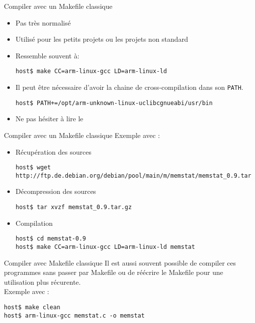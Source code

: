 \begin{frame}[fragile=singleslide]{Compiler avec un Makefile classique}
  \begin{itemize}
  \item Pas très normalisé
  \item Utilisé pour les petits projets ou les projets non standard
  \item Ressemble souvent à:
    \begin{lstlisting}
host$ make CC=arm-linux-gcc LD=arm-linux-ld 
    \end{lstlisting} %
  \item Il peut être nécessaire d'avoir la chaine de cross-compilation
    dans son \verb+PATH+.
    \begin{lstlisting}
host$ PATH+=/opt/arm-unknown-linux-uclibcgnueabi/usr/bin
    \end{lstlisting} %
  \item Ne pas hésiter à lire le 
  \end{itemize}
\end{frame}

\begin{frame}[fragile=singleslide]{Compiler avec un Makefile classique}
  Exemple avec :
  \begin{itemize}
  \item Récupération des sources
    \begin{lstlisting}
host$ wget http://ftp.de.debian.org/debian/pool/main/m/memstat/memstat_0.9.tar.gz
    \end{lstlisting}
  \item Décompression des sources
\begin{lstlisting}
host$ tar xvzf memstat_0.9.tar.gz
\end{lstlisting}
  \item Compilation
\begin{lstlisting}
host$ cd memstat-0.9
host$ make CC=arm-linux-gcc LD=arm-linux-ld memstat
\end{lstlisting} %
  \end{itemize}
\end{frame}

\begin{frame}[fragile=singleslide]{Compiler avec Makefile classique}
  Il est aussi souvent possible de compiler ces programmes sans passer
  par Makefile  ou de réécrire  le Makefile pour une  utilisation plus
  récurente.
  \\[2ex]
  Exemple avec :
\begin{lstlisting}
host$ make clean
host$ arm-linux-gcc memstat.c -o memstat
\end{lstlisting} %
\end{frame}


